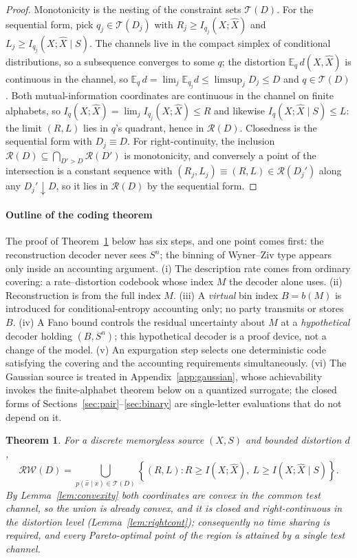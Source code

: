 \documentclass[11pt,onecolumn]{IEEEtran}
\newtheorem{theorem}{Theorem}
\newcommand{\E}{\mathbb{E}}
\newcommand{\hX}{\widehat{X}}
\newcommand{\RW}{\mathcal{R}\!\mathcal{W}}
\begin{document}
\begin{proof}
Monotonicity is the nesting of the constraint sets $\mathcal T(D)$. For
the sequential form, pick $q_j\in\mathcal T(D_j)$ with
$R_j\ge I_{q_j}(X;\hX)$ and $L_j\ge I_{q_j}(X;\hX\mid S)$. The channels
live in the compact simplex of conditional distributions, so a
subsequence converges to some $q$; the distortion $\E_q\,d(X,\hX)$ is
continuous in the channel, so
$\E_q\,d=\lim_j\E_{q_j}d\le\limsup_jD_j\le D$ and $q\in\mathcal T(D)$.
Both mutual-information coordinates are continuous in the channel on
finite alphabets, so $I_q(X;\hX)=\lim_jI_{q_j}(X;\hX)\le R$ and
likewise $I_q(X;\hX\mid S)\le L$: the limit $(R,L)$ lies in $q$'s
quadrant, hence in $\mathcal R(D)$. Closedness is the sequential form
with $D_j\equiv D$. For right-continuity, the inclusion
$\mathcal R(D)\subseteq\bigcap_{D'>D}\mathcal R(D')$ is monotonicity,
and conversely a point of the intersection is a constant sequence with
$(R_j,L_j)\equiv(R,L)\in\mathcal R(D_j')$ along any $D_j'\downarrow D$,
so it lies in $\mathcal R(D)$ by the sequential form.
\end{proof}

\paragraph*{Outline of the coding theorem}
The proof of Theorem~\ref{thm:main-region} below has six steps, and one
point comes first: the reconstruction
decoder never sees $S^n$; the binning of Wyner--Ziv type appears only
inside an accounting argument. (i) The description rate comes from
ordinary covering: a rate--distortion codebook whose index $M$ the
decoder alone uses. (ii) Reconstruction is from the full index $M$.
(iii) A \emph{virtual} bin index $B=b(M)$ is introduced for
conditional-entropy accounting only; no party transmits or stores $B$.
(iv) A Fano bound controls the residual uncertainty about $M$ at a
\emph{hypothetical} decoder holding $(B,S^n)$; this hypothetical decoder
is a proof device, not a change of the model. (v) An expurgation step
selects one deterministic code satisfying the covering and the
accounting requirements simultaneously. (vi) The Gaussian source is
treated in Appendix~\ref{app:gaussian}, whose achievability invokes the
finite-alphabet theorem below on a quantized surrogate; the closed
forms of Sections~\ref{sec:pair}--\ref{sec:binary} are single-letter
evaluations that do not depend on it.

\begin{theorem}\label{thm:main-region}
For a discrete memoryless source $(X,S)$ and bounded distortion $d$,
\begin{equation}
\boxed{
 \RW(D)
 =\bigcup_{p(\hat x\mid x)\in\mathcal T(D)}
 \left\{(R,L):
 R\ge I(X;\hX),\
 L\ge I(X;\hX\mid S)
 \right\}.}
 \label{eq:main-region}
\end{equation}
By Lemma~\ref{lem:convexity} both coordinates are convex in the common
test channel, so the union is already convex, and it is closed and
right-continuous in the distortion level (Lemma~\ref{lem:rightcont});
consequently no time sharing is required, and every Pareto-optimal
point of the region is attained by a single test channel.
\end{theorem}
\end{document}
